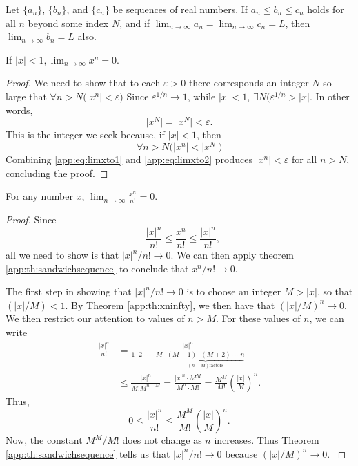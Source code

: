 \label{proof:sandwichsequence}
\begin{theorem}
  \label{app:th:sandwichsequence}
  Let $\{a_n\}$, $\{b_n\}$, and $\{c_n\}$ be sequences of real numbers. If
  $a_n \leq b_n \leq c_n $ holds for all $n$ beyond some index $N$, and if
  $\lim_{n\to\infty} a_n = \lim_{n\to\infty} c_n = L$, then
  $\lim_{n\to\infty} b_n = L$ also.
\end{theorem}
\begin{theorem}
  \label{app:th:xninfty}
  If \(|x| < 1, \lim_{n \to \infty} x^n = 0\).
  \begin{proof}
    We need to show that to each $\varepsilon > 0$ there corresponds an
    integer $N$ so large that $\forall n > N \big( |x^n| < \varepsilon\big)$
    Since $\varepsilon^{1/n}\to 1$, while $|x|<1$, $\exists N \big(
    \varepsilon^{1/n} > |x|$. In other words,
    \begin{equation}\label{app:eq:limxto1}
      \Big|x^N\Big| = \Big|x^N\Big| < \varepsilon.
    \end{equation}
    This is the integer we seek because, if $|x|< 1$, then
    \begin{equation}\label{app:eq:limxto2}
      \forall n > N \bigg( \Big|x^n\Big| < \Big|x^N\Big|\bigg)
    \end{equation}
    Combining \eqref{app:eq:limxto1} and \eqref{app:eq:limxto2} produces
    $|x^n|<\varepsilon$ for all $n > N$, concluding the
    proof.\cite[p.~AP-21]{thomas}
  \end{proof}
\end{theorem}
\label{proof:limxnnf}
\begin{theorem}
  For any number $x$, $\lim_{n\to\infty} \frac{x^n}{n!} = 0$.
    \cite[p.~AP-22]{thomas}
  \begin{proof}
  Since
  \[ - \frac{|x|^n}{n!} \leq \frac{x^n}{n!} \leq \frac{|x|^n}{n!},\]
  all we need to show is that $|x|^n/n! \to 0$. We can then apply theorem
  \ref{app:th:sandwichsequence} to conclude that $x^n/n! \to 0$.

  The first step in showing that $|x|^n/n! \to 0$ is to choose an integer $M
  > |x|$, so that $(|x|/M) < 1$. By Theorem \ref{app:th:xninfty}, we then have
  that $\left( |x|/M \right)^n \to 0$. We then restrict our attention to
  values of $n > M$. For these values of $n$, we can write
  \begin{align*}
    \frac{|x|^n}{n!}&=
    \frac{|x|^n}{1\cdot2\cdot\cdots\cdot M
      \cdot\underbrace{(M+1)\cdot(M+2)\cdot\cdots n}_{(n-M) \text{
      factors}}}
      \\
      &\leq \frac{|x|^n}{M!M^{n-M}}=\frac{|x|^n \cdot M^M}{M^n \cdot M!} =
      \frac{M^M}{M!} \left( \frac{|x|}{M} \right)^n .
  \end{align*}
  Thus,
  \[ 0 \leq \frac{|x|^n}{n!}\leq \frac{M^M}{M!}\left( \frac{|x|}{M}
    \right)^n .\]
    Now, the constant $M^M / M!$ does not change as $n$ increases. Thus
    Theorem \ref{app:th:sandwichsequence} tells us that $|x|^n/n! \to 0$ because
    $(|x|/M)^n \to 0$.
    \cite[p.~AP-22]{thomas}
  \end{proof}
\end{theorem}

